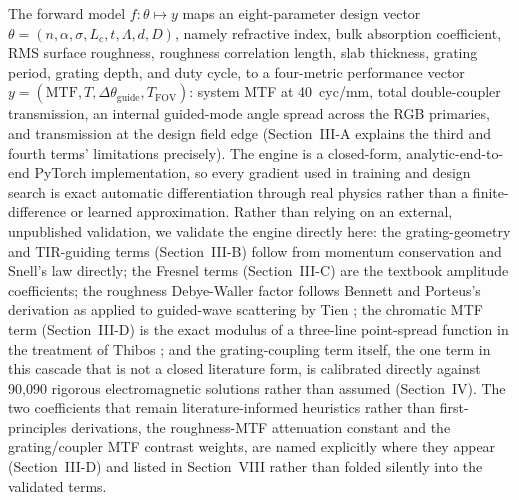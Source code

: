 \documentclass[10pt,twocolumn]{article}
\begin{document}
The forward model $f: \theta \mapsto y$ maps an eight-parameter design
vector $\theta = (n, \alpha, \sigma, L_c, t, \Lambda, d, D)$, namely
refractive index, bulk absorption coefficient, RMS surface roughness,
roughness correlation length, slab thickness, grating period, grating
depth, and duty cycle, to a four-metric performance vector
$y = (\mathrm{MTF}, T, \Delta\theta_{\mathrm{guide}}, T_{\mathrm{FOV}})$:
system MTF at 40~cyc/mm, total double-coupler transmission, an internal
guided-mode angle spread across the RGB primaries, and transmission at the
design field edge (Section~III-A explains the third and fourth terms'
limitations precisely). The engine is a closed-form, analytic-end-to-end
PyTorch implementation, so every gradient used in training and design
search is exact automatic differentiation through real physics rather than
a finite-difference or learned approximation. Rather than relying on an
external, unpublished validation, we validate the engine directly here: the
grating-geometry and TIR-guiding terms (Section~III-B) follow from momentum
conservation and Snell's law directly; the Fresnel terms (Section~III-C)
are the textbook amplitude coefficients; the roughness Debye-Waller factor
follows Bennett and Porteus's derivation \cite{bennett1961} as applied to
guided-wave scattering by Tien \cite{tien1971}; the chromatic MTF term
(Section~III-D) is the exact modulus of a three-line point-spread function
in the treatment of Thibos \cite{thibos1987}; and the grating-coupling term
itself, the one term in this cascade that is not a closed literature form,
is calibrated directly against 90,090 rigorous electromagnetic solutions
rather than assumed (Section~IV). The two coefficients that remain
literature-informed heuristics rather than first-principles derivations,
the roughness-MTF attenuation constant and the grating/coupler MTF contrast
weights, are named explicitly where they appear (Section~III-D) and listed
in Section~VIII rather than folded silently into the validated terms.
\end{document}
